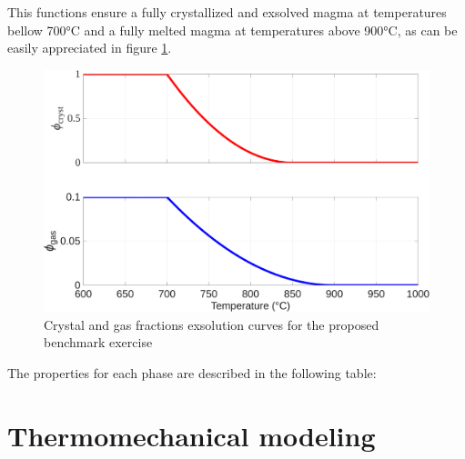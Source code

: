 This functions ensure a fully crystallized and exsolved magma at temperatures bellow 700°C and a fully melted magma at temperatures above 900°C, as can be easily appreciated in figure \ref{fig:phi_benchmark}.

\begin{figure}
	\centering
	\includegraphics[width=1\linewidth]{img/chapter2/benchmarks/phis.png}
	\caption{Crystal and gas fractions exsolution curves for the proposed benchmark exercise}
	\label{fig:phi_benchmark}
\end{figure}

The properties for each phase are described in the following table:

\begin{table}[H]
	\caption{Material properties for the different phases present in the magma, for the proposed benchamr simulation}
	\label{tab:benchmark_props}
\end{table}


\section{Thermomechanical modeling}
